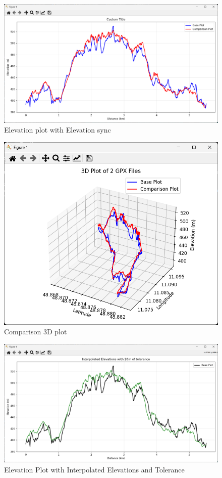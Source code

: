 \documentclass[12pt]{article}
\begin{document}
\begin{figure}[h!]
    \centering
    \includegraphics[width=\textwidth]{Project_Screenshots/sync.png}
    \caption{Elevation plot with Elevation sync}
\end{figure}

\begin{figure}[h!]
    \centering
    \includegraphics[width=\textwidth]{Project_Screenshots/3d plot.png}
    \caption{Comparison 3D plot	}
\end{figure}

\begin{figure}[h!]
    \centering
    \includegraphics[width=\textwidth]{Project_Screenshots/4ElevationPlotwInterpolatedElevationsandTolerance.png}
    \caption{Elevation Plot with Interpolated Elevations and Tolerance}
\end{figure}
\end{document}
